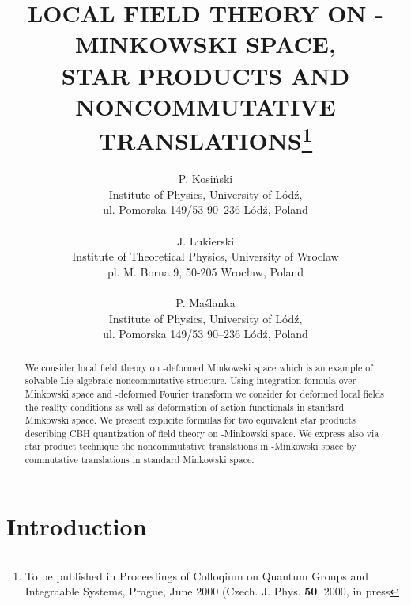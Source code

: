 \documentclass[a4paper,a4paper]{article}
\begin{document}
\title{LOCAL FIELD THEORY ON \myHighlight{$\kappa$}\coordHE{}-MINKOWSKI SPACE, 
\\ 
STAR PRODUCTS AND NONCOMMUTATIVE 
TRANSLATIONS\footnote{To be published in Proceedings of 
Colloqium on
Quantum Groups and Integraable   Systems, Prague, June 2000 
(Czech. J. Phys. {\bf 50}, 2000, in press}}
\author{P. Kosi\'{n}ski
 \\ Institute of Physics, 
University of L\'{o}d\'{z}, \\
ul. Pomorska 149/53 90--236 L\'{o}d\'{z}, Poland \\ \\
J. Lukierski \\
Institute of Theoretical Physics, 
 University of Wroclaw \\ pl. M. Borna 9, 50-205 Wroc\l aw, Poland 
\\ \\
P. Ma\'{s}lanka \\
Institute of Physics, 
University of L\'{o}d\'{z}, \\
ul. Pomorska 149/53 90--236 L\'{o}d\'{z}, Poland }
\date{}
\maketitle

\begin{abstract}
We consider local field theory on \myHighlight{$\kappa$}\coordHE{}-deformed Minkowski
space which is an example of solvable Lie-algebraic
noncommutative structure. Using integration formula over
\myHighlight{$\kappa$}\coordHE{}-Minkowski space and \myHighlight{$\kappa$}\coordHE{}-deformed Fourier 
transform
we consider for deformed local fields the reality conditions as
well as deformation of action functionals  in standard Minkowski
space. We present explicite formulas for two equivalent star
products describing CBH quantization of field theory on
\myHighlight{$\kappa$}\coordHE{}-Minkowski space. We express also via star product
technique the noncommutative translations in \myHighlight{$\kappa$}\coordHE{}-Minkowski
space by commutative translations in standard Minkowski space.
\end{abstract}

\section{Introduction}    
\end{document}
